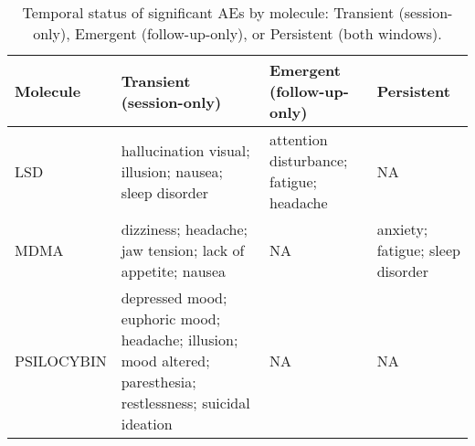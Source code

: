 \begin{table}[!h]
\centering
\caption{\label{tab:tab:ae-temporal-status}Temporal status of significant AEs by molecule: Transient (session-only), Emergent (follow-up-only), or Persistent (both windows).}
\centering
\begin{tabular}[t]{llll}
\toprule
Molecule & Transient (session-only) & Emergent (follow-up-only) & Persistent\\
\midrule
LSD & hallucination visual; illusion; nausea; sleep disorder & attention disturbance; fatigue; headache & NA\\
MDMA & dizziness; headache; jaw tension; lack of appetite; nausea & NA & anxiety; fatigue; sleep disorder\\
PSILOCYBIN & depressed mood; euphoric mood; headache; illusion; mood altered; paresthesia; restlessness; suicidal ideation & NA & NA\\
\bottomrule
\end{tabular}
\end{table}